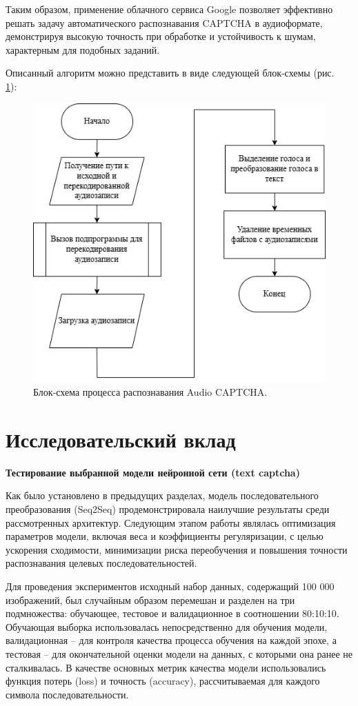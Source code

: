 Таким образом, применение облачного сервиса Google позволяет эффективно решать 
задачу автоматического распознавания CAPTCHA в аудиоформате, демонстрируя высокую 
точность при обработке и устойчивость к шумам, характерным для подобных заданий.

Описанный алгоритм можно представить в виде следующей блок-схемы (рис.~
\ref{fig:recognize-audio}):

\begin{figure}[H]
    \centering
    \includegraphics[width=0.6\linewidth]{
        imgs/audiocaptcha/recognize_audiocaptcha.png
    }
    \caption{Блок-схема процесса распознавания Audio CAPTCHA.}
    \label{fig:recognize-audio}
\end{figure}

\section{Исследовательский вклад}

\textbf{Тестирование выбранной модели нейронной сети (text captcha)}

Как было установлено в предыдущих разделах, модель последовательного 
преобразования (Seq2Seq) продемонстрировала наилучшие результаты среди 
рассмотренных архитектур. Следующим этапом работы являлась оптимизация параметров 
модели, включая веса и коэффициенты регуляризации, с целью ускорения сходимости, 
минимизации риска переобучения и повышения точности распознавания целевых 
последовательностей.

Для проведения экспериментов исходный набор данных, содержащий 100 000 
изображений, был случайным образом перемешан и разделен на три подмножества: 
обучающее, тестовое и валидационное в соотношении 80:10:10. Обучающая выборка 
использовалась непосредственно для обучения модели, валидационная -- для контроля 
качества процесса обучения на каждой эпохе, а тестовая -- для окончательной 
оценки модели на данных, с которыми она ранее не сталкивалась. В качестве 
основных метрик качества модели использовались функция потерь (loss) и точность 
(accuracy), рассчитываемая для каждого символа последовательности.

